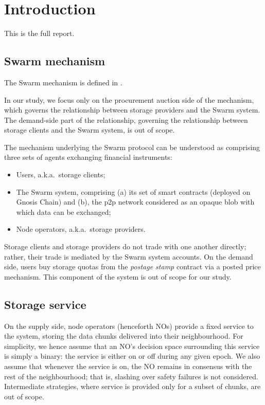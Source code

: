 \maketitle
\section{Introduction}

This is the full report.


\subsection{Swarm mechanism}

The Swarm mechanism is defined in \cite{book-of-swarm}.

In our study, we focus only on the procurement auction side of the mechanism, which governs the relationship between storage providers and the Swarm system.
%
The demand-side part of the relationship, governing the relationship between storage clients and the Swarm system, is out of scope.

The mechanism underlying the Swarm protocol can be understood as comprising three sets of agents exchanging financial instruments:
\begin{itemize}
  \item Users, a.k.a.~storage clients;
  \item The Swarm system, comprising (a) its set of smart contracts (deployed on Gnosis Chain) and (b), the p2p network considered as an opaque blob with which data can be exchanged;
  \item Node operators, a.k.a.~storage providers.
\end{itemize}
Storage clients and storage providers do not trade with one another directly; rather, their trade is mediated by the Swarm system accounts.
%
On the demand side, users buy storage quotas from the \emph{postage stamp} contract via a posted price mechanism. This component of the system is out of scope for our study.


\subsection{Storage service}

On the supply side, node operators (henceforth NOs) provide a fixed service to the system, storing the data chunks delivered into their neighbourhood.
%
For simplicity, we hence assume that an NO's decision space surrounding this service is simply a binary: the service is either on or off during any given epoch.
%
We also assume that whenever the service is on, the NO remains in consensus with the rest of the neighbourhood; that is, slashing over safety failures is not considered.
%
Intermediate strategies, where service is provided only for a subset of chunks, are out of scope.

